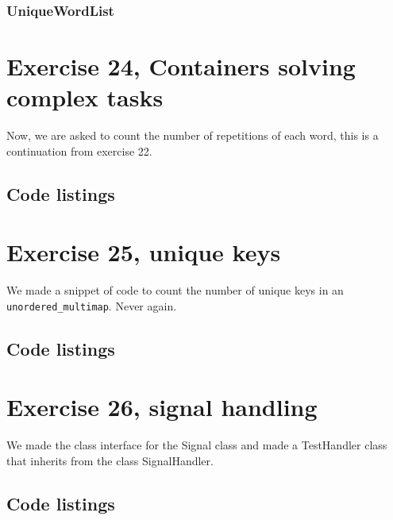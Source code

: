 \documentclass[11pt]{article}
\begin{document}
\subsubsection*{UniqueWordList}











\section*{Exercise 24, Containers solving complex tasks}
Now, we are asked to count the number of repetitions of each word, this is a continuation from exercise 22.

\subsection*{Code listings}



\section*{Exercise 25, unique keys}
We made a snippet of code to count the number of unique keys in an \texttt{unordered\_multimap}.
Never again.

\subsection*{Code listings}


\section*{Exercise 26, signal handling}
We made the class interface for the Signal class and made a TestHandler class that inherits from the class SignalHandler.

\subsection*{Code listings}






 
\end{document}
